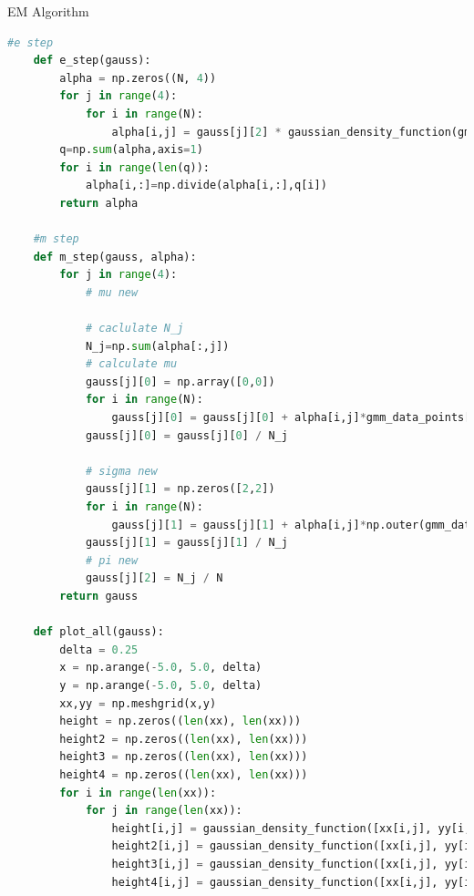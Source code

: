 \documentclass[
ngerman,
]{tudaexercise}
\begin{document}
\begin{task}{EM Algorithm}
\begin{subtask}
\begin{lstlisting}[language=Python]
	#e step
	def e_step(gauss):
		alpha = np.zeros((N, 4))
		for j in range(4):
			for i in range(N):
				alpha[i,j] = gauss[j][2] * gaussian_density_function(gmm_data_points[i], gauss[j][0], gauss[j][1])
		q=np.sum(alpha,axis=1)
		for i in range(len(q)):
			alpha[i,:]=np.divide(alpha[i,:],q[i])
		return alpha
	
	#m step
	def m_step(gauss, alpha):
		for j in range(4):
			# mu new
			
			# caclulate N_j
			N_j=np.sum(alpha[:,j])
			# calculate mu
			gauss[j][0] = np.array([0,0])
			for i in range(N):
				gauss[j][0] = gauss[j][0] + alpha[i,j]*gmm_data_points[i]
			gauss[j][0] = gauss[j][0] / N_j
			
			# sigma new
			gauss[j][1] = np.zeros([2,2])
			for i in range(N):
				gauss[j][1] = gauss[j][1] + alpha[i,j]*np.outer(gmm_data_points[i] - gauss[j][0],gmm_data_points[i] - gauss[j][0])
			gauss[j][1] = gauss[j][1] / N_j
			# pi new
			gauss[j][2] = N_j / N
		return gauss
	
	def plot_all(gauss):
		delta = 0.25
		x = np.arange(-5.0, 5.0, delta)
		y = np.arange(-5.0, 5.0, delta)
		xx,yy = np.meshgrid(x,y)
		height = np.zeros((len(xx), len(xx)))
		height2 = np.zeros((len(xx), len(xx)))
		height3 = np.zeros((len(xx), len(xx)))
		height4 = np.zeros((len(xx), len(xx)))
		for i in range(len(xx)):
			for j in range(len(xx)):
				height[i,j] = gaussian_density_function([xx[i,j], yy[i,j]], gauss[0][0], gauss[0][1])
				height2[i,j] = gaussian_density_function([xx[i,j], yy[i,j]], gauss[1][0], gauss[1][1])
				height3[i,j] = gaussian_density_function([xx[i,j], yy[i,j]], gauss[2][0], gauss[2][1])
				height4[i,j] = gaussian_density_function([xx[i,j], yy[i,j]], gauss[3][0], gauss[3][1])
				

\end{lstlisting}
\end{subtask}
\end{task}
\end{document}
